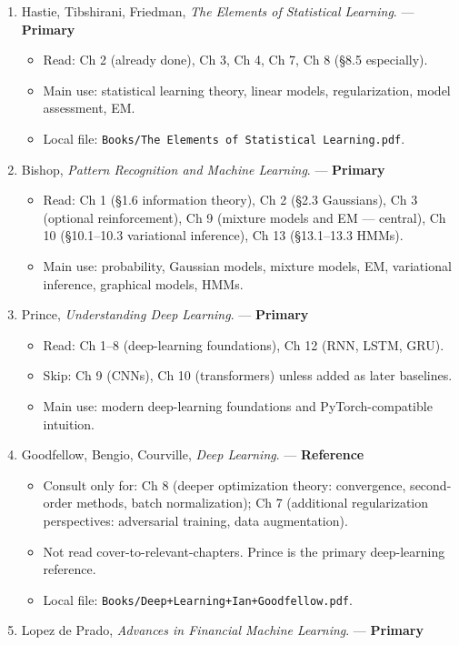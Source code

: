 \begin{enumerate}
\def\labelenumi{\arabic{enumi}.}
\tightlist
\item
  Hastie, Tibshirani, Friedman, \emph{The Elements of Statistical
  Learning}. --- \textbf{Primary}

  \begin{itemize}
  \tightlist
  \item
    Read: Ch 2 (already done), Ch 3, Ch 4, Ch 7, Ch 8 (§8.5 especially).
  \item
    Main use: statistical learning theory, linear models,
    regularization, model assessment, EM.
  \item
    Local file:
    \texttt{Books/The\ Elements\ of\ Statistical\ Learning.pdf}.
  \end{itemize}
\item
  Bishop, \emph{Pattern Recognition and Machine Learning}. ---
  \textbf{Primary}

  \begin{itemize}
  \tightlist
  \item
    Read: Ch 1 (§1.6 information theory), Ch 2 (§2.3 Gaussians), Ch 3
    (optional reinforcement), Ch 9 (mixture models and EM --- central),
    Ch 10 (§10.1--10.3 variational inference), Ch 13 (§13.1--13.3 HMMs).
  \item
    Main use: probability, Gaussian models, mixture models, EM,
    variational inference, graphical models, HMMs.
  \end{itemize}
\item
  Prince, \emph{Understanding Deep Learning}. --- \textbf{Primary}

  \begin{itemize}
  \tightlist
  \item
    Read: Ch 1--8 (deep-learning foundations), Ch 12 (RNN, LSTM, GRU).
  \item
    Skip: Ch 9 (CNNs), Ch 10 (transformers) unless added as later
    baselines.
  \item
    Main use: modern deep-learning foundations and PyTorch-compatible
    intuition.
  \end{itemize}
\item
  Goodfellow, Bengio, Courville, \emph{Deep Learning}. ---
  \textbf{Reference}

  \begin{itemize}
  \tightlist
  \item
    Consult only for: Ch 8 (deeper optimization theory: convergence,
    second-order methods, batch normalization); Ch 7 (additional
    regularization perspectives: adversarial training, data
    augmentation).
  \item
    Not read cover-to-relevant-chapters. Prince is the primary
    deep-learning reference.
  \item
    Local file: \texttt{Books/Deep+Learning+Ian+Goodfellow.pdf}.
  \end{itemize}
\item
  Lopez de Prado, \emph{Advances in Financial Machine Learning}. ---
  \textbf{Primary}


\end{enumerate}
